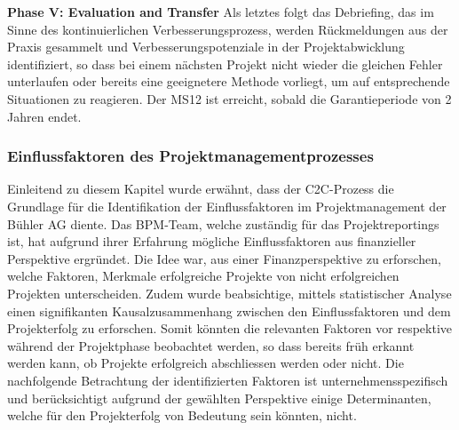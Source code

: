 \documentclass[11pt]{article}
\begin{document}
\newline
\textbf{Phase V: Evaluation and Transfer}
\newline
Als letztes folgt das Debriefing, das im Sinne des kontinuierlichen Verbesserungsprozess, werden Rückmeldungen aus der Praxis gesammelt und Verbesserungspotenziale in der Projektabwicklung identifiziert, so dass bei einem nächsten Projekt nicht wieder die gleichen Fehler unterlaufen oder bereits eine geeignetere Methode vorliegt, um auf entsprechende Situationen zu reagieren. Der MS12 ist erreicht, sobald die Garantieperiode von 2 Jahren endet. 

\subsubsection{Einflussfaktoren des Projektmanagementprozesses}\label{zweizwei}
Einleitend zu diesem Kapitel wurde erwähnt, dass der C2C-Prozess die Grundlage für die Identifikation der Einflussfaktoren im Projektmanagement der Bühler AG diente. Das BPM-Team, welche zuständig für das Projektreportings ist, hat aufgrund ihrer Erfahrung mögliche Einflussfaktoren aus finanzieller Perspektive ergründet. Die Idee war, aus einer Finanzperspektive zu erforschen, welche Faktoren, Merkmale erfolgreiche Projekte von nicht erfolgreichen Projekten unterscheiden. Zudem wurde beabsichtige, mittels statistischer Analyse einen signifikanten Kausalzusammenhang zwischen den Einflussfaktoren und dem Projekterfolg zu erforschen. Somit könnten die relevanten Faktoren vor respektive während der Projektphase beobachtet werden, so dass bereits früh erkannt werden kann, ob Projekte erfolgreich abschliessen werden oder nicht. Die nachfolgende Betrachtung der identifizierten Faktoren ist unternehmensspezifisch und berücksichtigt aufgrund der gewählten Perspektive einige Determinanten, welche für den Projekterfolg von Bedeutung sein könnten, nicht. 
\newline
\end{document}
